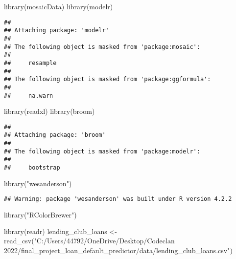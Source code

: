 \documentclass[
]{article}
\newenvironment{Shaded}{\begin{snugshade}}{\end{snugshade}}
\newcommand{\FunctionTok}[1]{\textcolor[rgb]{0.00,0.00,0.00}{#1}}
\newcommand{\NormalTok}[1]{#1}
\newcommand{\OtherTok}[1]{\textcolor[rgb]{0.56,0.35,0.01}{#1}}
\newcommand{\StringTok}[1]{\textcolor[rgb]{0.31,0.60,0.02}{#1}}
\begin{document}
\begin{Shaded}
\begin{Highlighting}[]
\FunctionTok{library}\NormalTok{(}\StringTok{\textquotesingle{}mosaicData\textquotesingle{}}\NormalTok{)}
\FunctionTok{library}\NormalTok{(}\StringTok{\textquotesingle{}modelr\textquotesingle{}}\NormalTok{)}
\end{Highlighting}
\end{Shaded}

\begin{verbatim}
## 
## Attaching package: 'modelr'
## 
## The following object is masked from 'package:mosaic':
## 
##     resample
## 
## The following object is masked from 'package:ggformula':
## 
##     na.warn
\end{verbatim}

\begin{Shaded}
\begin{Highlighting}[]
\FunctionTok{library}\NormalTok{(}\StringTok{\textquotesingle{}readxl\textquotesingle{}}\NormalTok{)}
\FunctionTok{library}\NormalTok{(}\StringTok{\textquotesingle{}broom\textquotesingle{}}\NormalTok{)}
\end{Highlighting}
\end{Shaded}

\begin{verbatim}
## 
## Attaching package: 'broom'
## 
## The following object is masked from 'package:modelr':
## 
##     bootstrap
\end{verbatim}

\begin{Shaded}
\begin{Highlighting}[]
\FunctionTok{library}\NormalTok{(}\StringTok{"wesanderson"}\NormalTok{)}
\end{Highlighting}
\end{Shaded}

\begin{verbatim}
## Warning: package 'wesanderson' was built under R version 4.2.2
\end{verbatim}

\begin{Shaded}
\begin{Highlighting}[]
\FunctionTok{library}\NormalTok{(}\StringTok{"RColorBrewer"}\NormalTok{)}
\end{Highlighting}
\end{Shaded}

\begin{Shaded}
\begin{Highlighting}[]
\FunctionTok{library}\NormalTok{(readr)}
\NormalTok{lending\_club\_loans }\OtherTok{\textless{}{-}} \FunctionTok{read\_csv}\NormalTok{(}\StringTok{"C:/Users/44792/OneDrive/Desktop/Codeclan 2022/final\_project\_loan\_default\_predictor/data/lending\_club\_loans.csv"}\NormalTok{)}
\end{Highlighting}
\end{Shaded}
\end{document}
